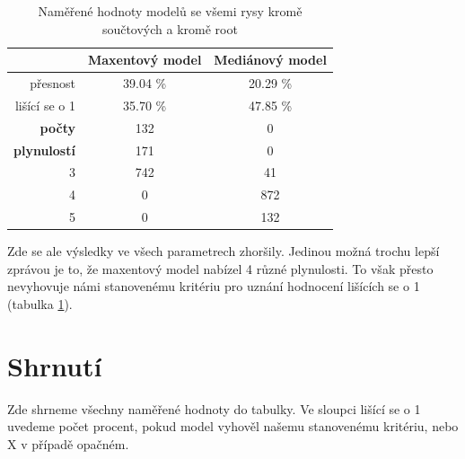 \documentclass[12pt,a4paper]{report}
\begin{document}
\begin{table}[!htbp]
\begin{center}
\begin{tabular}{|r|c|c|}
\hline
 & \textbf{Maxentový model} & \textbf{Mediánový model} \\
 \hline
     přesnost & 39.04 \%  & 20.29 \%  \\
\hline
lišící se o 1 & 35.70 \% & 47.85 \%  \\
\hline
     \textbf{počty} \quad 1 & 132   & \color{red} 0   \\
\textbf{plynulostí} \quad 2 & 171 & \color{red}0   \\
                          3 & 742 & 41 \\
                          4 & \color{red}0   & 872 \\
                          5 & \color{red}0   & 132  \\
\hline
\end{tabular}
\caption{Naměřené hodnoty modelů se všemi rysy kromě součtových a kromě root}\label{tb:woutsumsroot}
\end{center}
\end{table}

Zde se ale výsledky ve všech parametrech zhoršily. Jedinou možná trochu lepší zprávou je to, že maxentový model nabízel 4 různé plynulosti. To však přesto nevyhovuje námi stanovenému kritériu pro uznání hodnocení lišících se o 1 (tabulka \ref{tb:woutsumsroot}).

\pagebreak

\section{Shrnutí}
Zde shrneme všechny naměřené hodnoty do tabulky. Ve sloupci lišící se o 1 uvedeme počet procent, pokud model vyhověl našemu stanovenému kritériu, nebo X v případě opačném.
\end{document}
